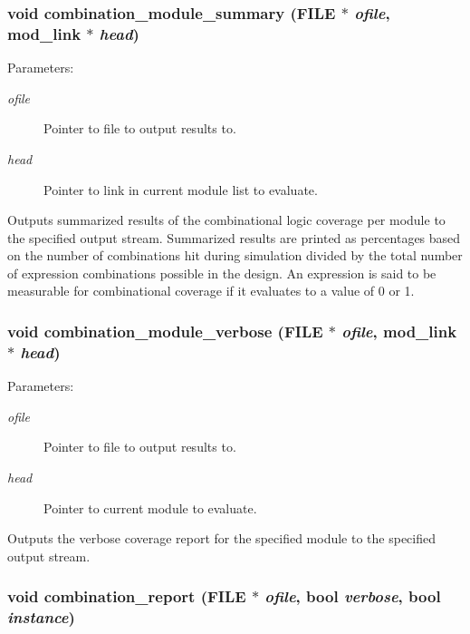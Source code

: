 \subsubsection{\setlength{\rightskip}{0pt plus 5cm}void combination\_\-module\_\-summary (FILE $\ast$ {\em ofile}, {\bf mod\_\-link} $\ast$ {\em head})}\label{comb_8c_a4}


\begin{Desc}
\item[Parameters: ]\par
\begin{description}
\item[{\em 
ofile}]Pointer to file to output results to. \item[{\em 
head}]Pointer to link in current module list to evaluate.\end{description}
\end{Desc}
Outputs summarized results of the combinational logic coverage per module to the specified output stream. Summarized results are printed as  percentages based on the number of combinations hit during simulation  divided by the total number of expression combinations possible in the  design. An expression is said to be measurable for combinational coverage  if it evaluates to a value of 0 or 1. 
\subsubsection{\setlength{\rightskip}{0pt plus 5cm}void combination\_\-module\_\-verbose (FILE $\ast$ {\em ofile}, {\bf mod\_\-link} $\ast$ {\em head})}\label{comb_8c_a10}


\begin{Desc}
\item[Parameters: ]\par
\begin{description}
\item[{\em 
ofile}]Pointer to file to output results to. \item[{\em 
head}]Pointer to current module to evaluate.\end{description}
\end{Desc}
Outputs the verbose coverage report for the specified module to the specified output stream. 
\subsubsection{\setlength{\rightskip}{0pt plus 5cm}void combination\_\-report (FILE $\ast$ {\em ofile}, {\bf bool} {\em verbose}, {\bf bool} {\em instance})}\label{comb_8c_a11}


